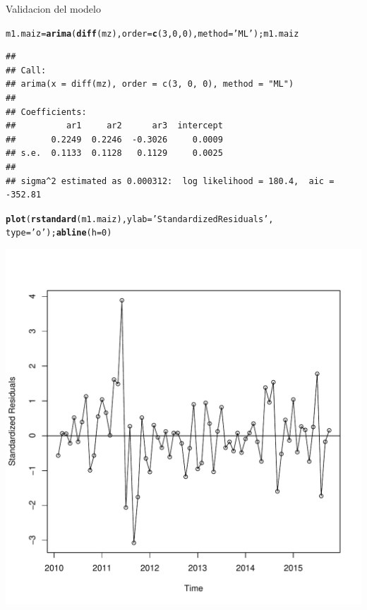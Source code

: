 \documentclass{article}\usepackage[]{graphicx}\usepackage[]{color}
\makeatletter
\def\maxwidth{ %
  \ifdim\Gin@nat@width>\linewidth
    \linewidth
  \else
    \Gin@nat@width
  \fi
}
\newcommand{\hlnum}[1]{\textcolor[rgb]{0.686,0.059,0.569}{#1}}%
\newcommand{\hlstr}[1]{\textcolor[rgb]{0.192,0.494,0.8}{#1}}%
\newcommand{\hlstd}[1]{\textcolor[rgb]{0.345,0.345,0.345}{#1}}%
\newcommand{\hlkwb}[1]{\textcolor[rgb]{0.69,0.353,0.396}{#1}}%
\newcommand{\hlkwc}[1]{\textcolor[rgb]{0.333,0.667,0.333}{#1}}%
\newcommand{\hlkwd}[1]{\textcolor[rgb]{0.737,0.353,0.396}{\textbf{#1}}}%
\newenvironment{kframe}{%
 \def\at@end@of@kframe{}%
 \ifinner\ifhmode%
  \def\at@end@of@kframe{\end{minipage}}%
  \begin{minipage}{\columnwidth}%
 \fi\fi%
 \def\FrameCommand##1{\hskip\@totalleftmargin \hskip-\fboxsep
 \colorbox{shadecolor}{##1}\hskip-\fboxsep
     \hskip-\linewidth \hskip-\@totalleftmargin \hskip\columnwidth}%
 \MakeFramed {\advance\hsize-\width
   \@totalleftmargin\z@ \linewidth\hsize
   \@setminipage}}%
 {\par\unskip\endMakeFramed%
 \at@end@of@kframe}
\newenvironment{knitrout}{}{} %
\makeatother
\begin{document}
Validacion del modelo

\begin{knitrout}
\color{fgcolor}\begin{kframe}
\begin{alltt}
\hlstd{m1.maiz}\hlkwb{=}\hlkwd{arima}\hlstd{(}\hlkwd{diff}\hlstd{(mz),}\hlkwc{order}\hlstd{=}\hlkwd{c}\hlstd{(}\hlnum{3}\hlstd{,}\hlnum{0}\hlstd{,}\hlnum{0}\hlstd{),} \hlkwc{method}\hlstd{=}\hlstr{'ML'}\hlstd{); m1.maiz}
\end{alltt}
\begin{verbatim}
## 
## Call:
## arima(x = diff(mz), order = c(3, 0, 0), method = "ML")
## 
## Coefficients:
##          ar1     ar2      ar3  intercept
##       0.2249  0.2246  -0.3026     0.0009
## s.e.  0.1133  0.1128   0.1129     0.0025
## 
## sigma^2 estimated as 0.000312:  log likelihood = 180.4,  aic = -352.81
\end{verbatim}
\begin{alltt}
\hlkwd{plot}\hlstd{(}\hlkwd{rstandard}\hlstd{(m1.maiz),}\hlkwc{ylab} \hlstd{=}\hlstr{'Standardized Residuals'}\hlstd{,}
       \hlkwc{type}\hlstd{=}\hlstr{'o'}\hlstd{);} \hlkwd{abline}\hlstd{(}\hlkwc{h}\hlstd{=}\hlnum{0}\hlstd{)}
\end{alltt}
\end{kframe}
\includegraphics[width=\maxwidth]{figure/unnamed-chunk-4-1} 

\end{knitrout}
\end{document}
